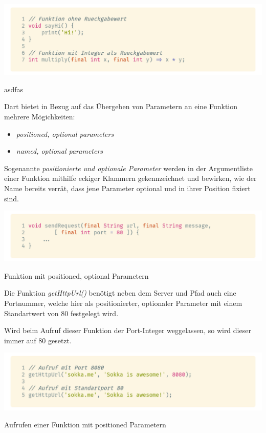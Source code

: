 \begin{code}
    \centering
    \includegraphics[width=1\textwidth]{images/Dart/theory/dartFunctions.png}
    \caption{asdfas}
\end{code}

Dart bietet in Bezug auf das Übergeben von Parametern an eine Funktion mehrere Mögichkeiten:
\begin{itemize}
    \item \textit{positioned, optional parameters}
    \item \textit{named, optional parameters}
\end{itemize}

Sogenannte \textit{positionierte und optionale Parameter} werden in der Argumentliste einer Funktion
mithilfe eckiger Klammern gekennzeichnet und bewirken, wie der Name bereits verrät, dass jene Parameter
optional und in ihrer Position fixiert sind.

\begin{code}
    \centering
    \includegraphics[width=1\textwidth]{images/Dart/theory/dartPositionedArgumentsFunction.png}
    \caption{Funktion mit positioned, optional Parametern}
\end{code}

Die Funktion \textit{getHttpUrl()} benötigt neben dem Server und Pfad auch eine Portnummer, welche
hier als positionierter, optionaler Parameter mit einem Standartwert von 80 festgelegt wird.

Wird beim Aufruf dieser Funktion der Port-Integer weggelassen, so wird dieser immer auf 80 gesetzt.

\begin{code}
    \centering
    \includegraphics[width=1\textwidth]{images/Dart/theory/dartCallPositionedFunction.png}
    \caption{Aufrufen einer Funktion mit positioned Parametern}
\end{code}

